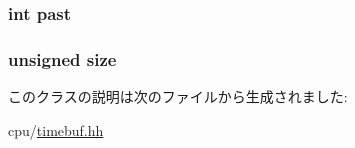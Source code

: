 \label{classTimeBuffer_ac3457cf300977865df9ce15f184df586}
\hypertarget{classTimeBuffer_acc958e04c64d7f8589872c70820fef8d}{
\subsubsection[{past}]{\setlength{\rightskip}{0pt plus 5cm}int {\bf past}}}
\label{classTimeBuffer_acc958e04c64d7f8589872c70820fef8d}
\hypertarget{classTimeBuffer_a245260f6f74972558f61b85227df5aae}{
\subsubsection[{size}]{\setlength{\rightskip}{0pt plus 5cm}unsigned {\bf size}}}
\label{classTimeBuffer_a245260f6f74972558f61b85227df5aae}


このクラスの説明は次のファイルから生成されました:\begin{DoxyCompactItemize}
\item 
cpu/\hyperlink{timebuf_8hh}{timebuf.hh}\end{DoxyCompactItemize}
